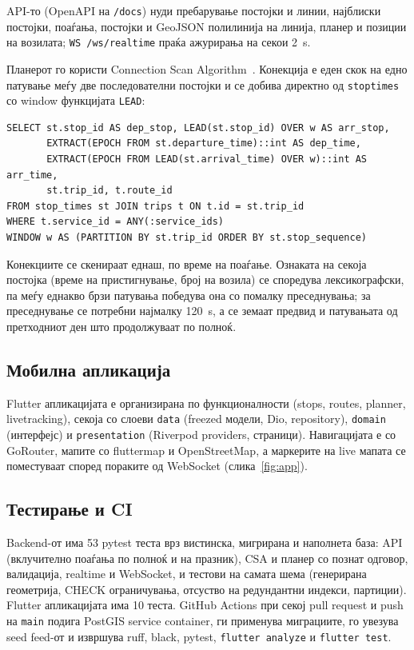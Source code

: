 \documentclass[11pt, a4paper]{article}
\renewcommand{\_}{\oldunderscore\allowbreak}
\newcommand{\code}[1]{\texttt{#1}}
\begin{document}
API-то (OpenAPI на \code{/docs}) нуди пребарување постојки и линии, најблиски постојки, поаѓања, постојки и GeoJSON полилинија на линија, планер и позиции на возилата; \code{WS /ws/realtime} праќа ажурирања на секои 2~s.

Планерот го користи Connection Scan Algorithm~\cite{csa}. Конекција е еден скок на едно патување меѓу две последователни постојки и се добива директно од \code{stop\_times} со window функцијата \code{LEAD}:

\begin{lstlisting}
SELECT st.stop_id AS dep_stop, LEAD(st.stop_id) OVER w AS arr_stop,
       EXTRACT(EPOCH FROM st.departure_time)::int AS dep_time,
       EXTRACT(EPOCH FROM LEAD(st.arrival_time) OVER w)::int AS arr_time,
       st.trip_id, t.route_id
FROM stop_times st JOIN trips t ON t.id = st.trip_id
WHERE t.service_id = ANY(:service_ids)
WINDOW w AS (PARTITION BY st.trip_id ORDER BY st.stop_sequence)
\end{lstlisting}

Конекциите се скенираат еднаш, по време на поаѓање. Ознаката на секоја постојка (време на пристигнување, број на возила) се споредува лексикографски, па меѓу еднакво брзи патувања победува она со помалку преседнувања; за преседнување се потребни најмалку 120~s, а се земаат предвид и патувањата од претходниот ден што продолжуваат по полноќ.

\subsection{Мобилна апликација}

Flutter апликацијата е организирана по функционалности (stops, routes, planner, live\_tracking), секоја со слоеви \code{data} (freezed модели, Dio, repository), \code{domain} (интерфејс) и \code{presentation} (Riverpod providers, страници). Навигацијата е со GoRouter, мапите со flutter\_map и OpenStreetMap, а маркерите на live мапата се поместуваат според пораките од WebSocket (слика~\ref{fig:app}).

\subsection{Тестирање и CI}

Backend-от има 53 pytest теста врз вистинска, мигрирана и наполнета база: API (вклучително поаѓања по полноќ и на празник), CSA и планер со познат одговор, валидација, realtime и WebSocket, и тестови на самата шема (генерирана геометрија, CHECK ограничувања, отсуство на редундантни индекси, партиции). Flutter апликацијата има 10 теста. GitHub Actions при секој pull request и push на \code{main} подига PostGIS service container, ги применува миграциите, го увезува seed feed-от и извршува ruff, black, pytest, \code{flutter analyze} и \code{flutter test}.
\end{document}
